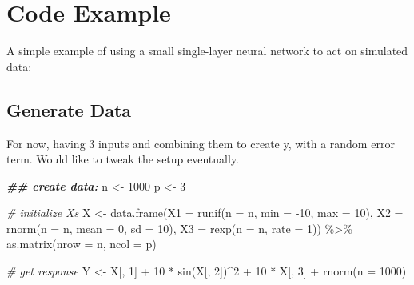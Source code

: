 \documentclass[
]{book}
\newenvironment{Shaded}{\begin{snugshade}}{\end{snugshade}}
\newcommand{\AttributeTok}[1]{\textcolor[rgb]{0.77,0.63,0.00}{#1}}
\newcommand{\CommentTok}[1]{\textcolor[rgb]{0.56,0.35,0.01}{\textit{#1}}}
\newcommand{\DecValTok}[1]{\textcolor[rgb]{0.00,0.00,0.81}{#1}}
\newcommand{\DocumentationTok}[1]{\textcolor[rgb]{0.56,0.35,0.01}{\textbf{\textit{#1}}}}
\newcommand{\FunctionTok}[1]{\textcolor[rgb]{0.00,0.00,0.00}{#1}}
\newcommand{\NormalTok}[1]{#1}
\newcommand{\OtherTok}[1]{\textcolor[rgb]{0.56,0.35,0.01}{#1}}
\newcommand{\SpecialCharTok}[1]{\textcolor[rgb]{0.00,0.00,0.00}{#1}}
\begin{document}
\hypertarget{code-example}{%
\section{Code Example}\label{code-example}}

A simple example of using a small single-layer neural network to act on simulated data:

\hypertarget{generate-data}{%
\subsection{Generate Data}\label{generate-data}}

For now, having 3 inputs and combining them to create y, with a random error term. Would like to tweak the setup eventually.

\begin{Shaded}
\begin{Highlighting}[]
\DocumentationTok{\#\# create data:}
\NormalTok{n }\OtherTok{\textless{}{-}} \DecValTok{1000}
\NormalTok{p }\OtherTok{\textless{}{-}} \DecValTok{3}

\CommentTok{\# initialize Xs}
\NormalTok{X }\OtherTok{\textless{}{-}} \FunctionTok{data.frame}\NormalTok{(}\AttributeTok{X1 =} \FunctionTok{runif}\NormalTok{(}\AttributeTok{n =}\NormalTok{ n, }\AttributeTok{min =} \SpecialCharTok{{-}}\DecValTok{10}\NormalTok{, }\AttributeTok{max =} \DecValTok{10}\NormalTok{),}
                \AttributeTok{X2 =} \FunctionTok{rnorm}\NormalTok{(}\AttributeTok{n =}\NormalTok{ n, }\AttributeTok{mean =} \DecValTok{0}\NormalTok{, }\AttributeTok{sd =} \DecValTok{10}\NormalTok{),}
                \AttributeTok{X3 =} \FunctionTok{rexp}\NormalTok{(}\AttributeTok{n =}\NormalTok{ n, }\AttributeTok{rate =} \DecValTok{1}\NormalTok{)) }\SpecialCharTok{\%\textgreater{}\%}
  \FunctionTok{as.matrix}\NormalTok{(}\AttributeTok{nrow =}\NormalTok{ n,}
            \AttributeTok{ncol =}\NormalTok{ p)}

\CommentTok{\# get response}
\NormalTok{Y }\OtherTok{\textless{}{-}}\NormalTok{ X[, }\DecValTok{1}\NormalTok{] }\SpecialCharTok{+} \DecValTok{10} \SpecialCharTok{*} \FunctionTok{sin}\NormalTok{(X[, }\DecValTok{2}\NormalTok{])}\SpecialCharTok{\^{}}\DecValTok{2} \SpecialCharTok{+} \DecValTok{10} \SpecialCharTok{*}\NormalTok{ X[, }\DecValTok{3}\NormalTok{] }\SpecialCharTok{+} \FunctionTok{rnorm}\NormalTok{(}\AttributeTok{n =} \DecValTok{1000}\NormalTok{)}
\end{Highlighting}
\end{Shaded}
\end{document}

